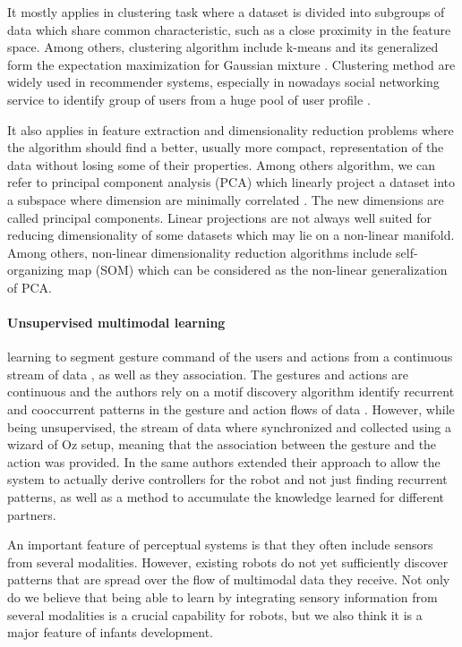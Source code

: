 It mostly applies in clustering task where a dataset is divided into subgroups of data which share common characteristic, such as a close proximity in the feature space. Among others, clustering algorithm include k-means and its generalized form the expectation maximization for Gaussian mixture \cite{dempster1977maximum}. Clustering method are widely used in recommender systems, especially in nowadays social networking service to identify group of users from a huge pool of user profile \cite{sarwar2002recommender}.

It also applies in feature extraction and dimensionality reduction problems where the algorithm should find a better, usually more compact, representation of the data without losing some of their properties. Among others algorithm, we can refer to principal component analysis (PCA) which linearly project a dataset into a subspace where dimension are minimally correlated \cite{jolliffe2005principal}. The new dimensions are called principal components. Linear projections are not always well suited for reducing dimensionality of some datasets which may lie on a non-linear manifold. Among others, non-linear dimensionality reduction algorithms include self-organizing map (SOM) \cite{kohonen2001self} which can be considered as the non-linear generalization of PCA.

\paragraph{Unsupervised multimodal learning}

\cite{mohammad2009unsupervised} learning to segment gesture command of the users and actions from a continuous stream of data , as well as they association. The gestures and actions are continuous and the authors rely on a motif discovery algorithm identify recurrent  and cooccurrent patterns in the gesture and action flows of data \cite{mohammad2009constrained}. However, while being unsupervised, the stream of data where synchronized and collected using a wizard of Oz setup, meaning that the association between the gesture and the action was provided. In \cite{mohammad2010learning} the same authors extended their approach to allow the system to actually derive controllers for the robot and not just finding recurrent patterns, as well as a method to accumulate the knowledge learned for different partners.


\cite{mangin2012learning,mangin2013learning,mangin2014thesis}

 An important feature of perceptual systems is that they often include sensors from several modalities. However, existing robots do not yet sufficiently discover patterns that are spread over the flow of multimodal data they receive. Not only do we believe that being able to learn by integrating sensory information from several modalities is a crucial capability for robots, but we also think it is a major feature of infants development.

